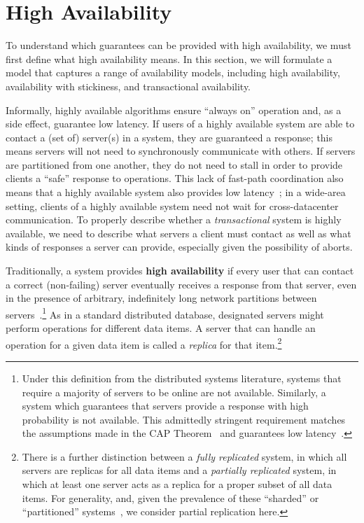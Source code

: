 
\section{High Availability}
\label{sec:availability}

To understand which guarantees can be provided with high availability,
we must first define what high availability means. In this section, we
will formulate a model that captures a range of availability models,
including high availability, availability with stickiness, and
transactional availability.

Informally, highly available algorithms ensure ``always on'' operation
and, as a side effect, guarantee low latency. If users of a highly
available system are able to contact a (set of) server(s) in a system,
they are guaranteed a response; this means servers will not need to
synchronously communicate with others. If servers are partitioned from one
another, they do not need to stall in order to provide clients a
``safe'' response to operations. This lack of fast-path coordination
also means that a highly available system also provides low
latency~\cite{abadi-pacelc}; in a wide-area setting, clients of a
highly available system need not wait for cross-datacenter
communication. To properly describe whether a \textit{transactional}
system is highly available, we need to describe what servers a client
must contact as well as what kinds of responses a server can provide,
especially given the possibility of aborts.

Traditionally, a system provides {\textbf{high availability}} if every
user that can contact a correct (non-failing) server eventually
receives a response from that server, even in the presence of
arbitrary, indefinitely long network partitions between
servers~\cite{gilbert-cap}.\footnote{Under this definition from the
  distributed systems literature, systems that require a majority of
  servers to be online are not available. Similarly, a system which
  guarantees that servers provide a response with high probability is
  not available. This admittedly stringent requirement matches the
  assumptions made in the CAP Theorem~\cite{gilbert-cap} and
  guarantees low latency~\cite{abadi-pacelc}.} As in a standard
distributed database, designated servers might perform operations for
different data items. A server that can handle an operation for a
given data item is called a \textit{replica} for that
item.\footnote{There is a further distinction between a \textit{fully
    replicated} system, in which all servers are replicas for all data
  items and a \textit{partially replicated} system, in which at least
  one server acts as a replica for a proper subset of all data
  items. For generality, and, given the prevalence of these
  ``sharded'' or ``partitioned'' systems~\cite{ bigtable, pnuts,
    spanner, dynamo, hstore}, we consider partial replication here.}

